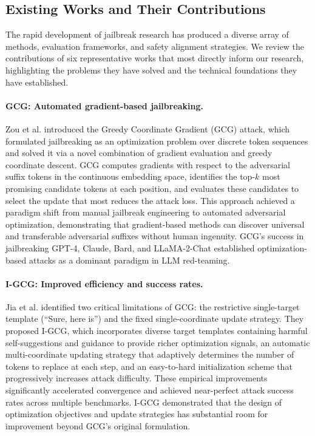 ﻿\documentclass[lettersize,journal]{IEEEtran}
\begin{document}
\subsection{Existing Works and Their Contributions}
\label{sec:existing_works}

The rapid development of jailbreak research has produced a diverse array of methods, evaluation frameworks, and safety alignment strategies. We review the contributions of six representative works that most directly inform our research, highlighting the problems they have solved and the technical foundations they have established.

\paragraph{GCG: Automated gradient-based jailbreaking.} Zou et al. \cite{zou2023universal} introduced the Greedy Coordinate Gradient (GCG) attack, which formulated jailbreaking as an optimization problem over discrete token sequences and solved it via a novel combination of gradient evaluation and greedy coordinate descent. GCG computes gradients with respect to the adversarial suffix tokens in the continuous embedding space, identifies the top-$k$ most promising candidate tokens at each position, and evaluates these candidates to select the update that most reduces the attack loss. This approach achieved a paradigm shift from manual jailbreak engineering to automated adversarial optimization, demonstrating that gradient-based methods can discover universal and transferable adversarial suffixes without human ingenuity. GCG's success in jailbreaking GPT-4, Claude, Bard, and LLaMA-2-Chat established optimization-based attacks as a dominant paradigm in LLM red-teaming.

\paragraph{I-GCG: Improved efficiency and success rates.} Jia et al. \cite{jia2024improved} identified two critical limitations of GCG: the restrictive single-target template (``Sure, here is'') and the fixed single-coordinate update strategy. They proposed I-GCG, which incorporates diverse target templates containing harmful self-suggestions and guidance to provide richer optimization signals, an automatic multi-coordinate updating strategy that adaptively determines the number of tokens to replace at each step, and an easy-to-hard initialization scheme that progressively increases attack difficulty. These empirical improvements significantly accelerated convergence and achieved near-perfect attack success rates across multiple benchmarks. I-GCG demonstrated that the design of optimization objectives and update strategies has substantial room for improvement beyond GCG's original formulation.
\end{document}

